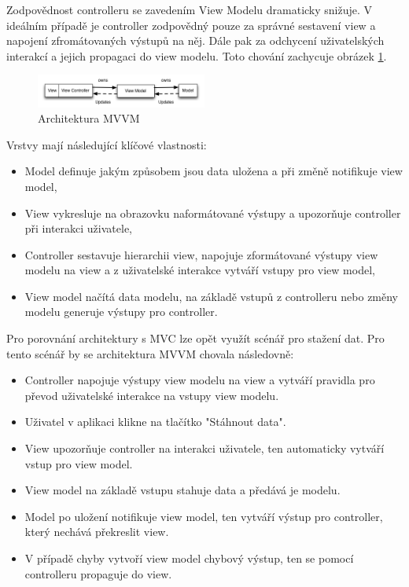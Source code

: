 Zodpovědnost controlleru se zavedením View Modelu dramaticky snižuje.
V ideálním případě je controller zodpovědný pouze za správné sestavení view a napojení zfromátovaných výstupů na něj.
Dále pak za odchycení uživatelských interakcí a jejich propagaci do view modelu.
Toto chování zachycuje obrázek \ref{mvvm-architecture}.

\begin{figure}\centering
	\includegraphics[width=0.5\textwidth]{assets/mvvm-architecture.png}
	\caption[Architektura MVVM]{Architektura MVVM}\label{mvvm-architecture}
\end{figure}

Vrstvy mají následující klíčové vlastnosti:
\begin{itemize}
  \item Model definuje jakým způsobem jsou data uložena a při změně notifikuje view model,
  \item View vykresluje na obrazovku naformátované výstupy a upozorňuje controller při interakci uživatele,
  \item Controller sestavuje hierarchii view, napojuje zformátované výstupy view modelu na view a z uživatelské interakce vytváří vstupy pro view model,
  \item View model načítá data modelu, na základě vstupů z controlleru nebo změny modelu generuje výstupy pro controller.
\end{itemize}

Pro porovnání architektury s MVC lze opět využít scénář pro stažení dat. Pro tento scénář by se architektura MVVM chovala následovně:
\begin{itemize}
  \item Controller napojuje výstupy view modelu na view a vytváří pravidla pro převod uživatelské interakce na vstupy view modelu.
  \item Uživatel v aplikaci klikne na tlačítko "Stáhnout data".
  \item View upozorňuje controller na interakci uživatele, ten automaticky vytváří vstup pro view model.
  \item View model na základě vstupu stahuje data a předává je modelu.
  \item Model po uložení notifikuje view model, ten vytváří výstup pro controller, který nechává překreslit view.
  \item V případě chyby vytvoří view model chybový výstup, ten se pomocí controlleru propaguje do view.
\end{itemize}

